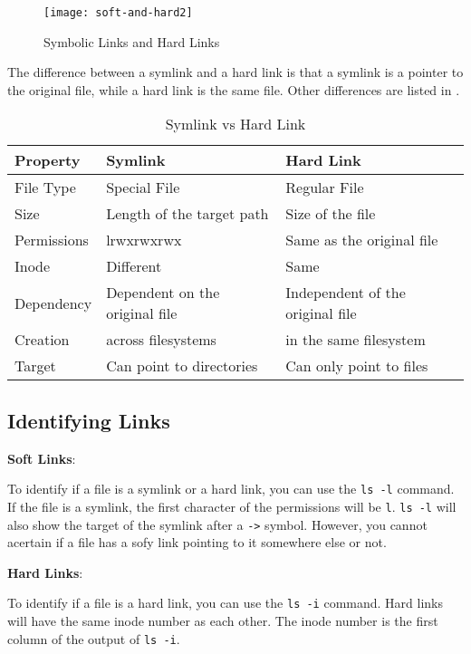 \begin{figure}[hb]
  \texttt{[image: soft-and-hard2]}
  \caption[Symbolic Links and Hard Links]{Symbolic Links and Hard Links}
\end{figure}

The difference between a symlink and a hard link is that a symlink is a pointer to the original file, while a hard link is the same file.
Other differences are listed in .

\begin{table*}[hb]
\caption{Symlink vs Hard Link}
\begin{tabular}{ l l l }
  \toprule
  Property & Symlink & Hard Link \\
 \midrule
  File Type & Special File & Regular File \\
  Size & Length of the target path & Size of the file \\
  Permissions & lrwxrwxrwx & Same as the original file \\
  Inode & Different & Same \\
  Dependency & Dependent on the original file & Independent of the original file \\
  Creation & across filesystems & in the same filesystem \\
  Target & Can point to directories & Can only point to files \\
 \bottomrule
 \end{tabular}
\end{table*}

\subsection{Identifying Links}

\textbf{Soft Links}:

To identify if a file is a symlink or a hard link, you can use the \lstinline|ls -l| command.
If the file is a symlink, the first character of the permissions will be \lstinline|l|.
\lstinline|ls -l| will also show the target of the symlink after a \lstinline|->| symbol.
However, you cannot acertain if a file has a sofy link pointing to it somewhere else or not.

\textbf{Hard Links}:

To identify if a file is a hard link, you can use the \lstinline|ls -i| command.
Hard links will have the same inode number as each other.
The inode number is the first column of the output of \lstinline|ls -i|.


